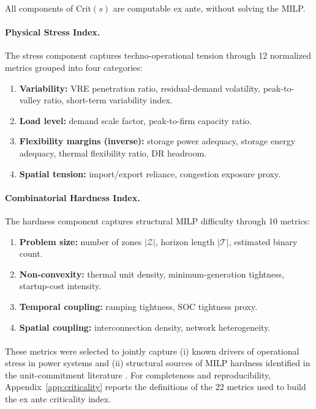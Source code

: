 \documentclass{article}
\let\parencite\citep
\begin{document}
All components of $\mathrm{Crit}(s)$ are computable ex ante, without solving the MILP.

\paragraph{Physical Stress Index.}
The stress component captures techno-operational tension through 12 normalized metrics grouped into four categories:
\begin{enumerate}[noitemsep, label=(\alph*)]
  \item \textbf{Variability:} VRE penetration ratio, residual-demand volatility, peak-to-valley ratio, short-term variability index.
  \item \textbf{Load level:} demand scale factor, peak-to-firm capacity ratio.
  \item \textbf{Flexibility margins (inverse):} storage power adequacy, storage energy adequacy, thermal flexibility ratio, DR headroom.
  \item \textbf{Spatial tension:} import/export reliance, congestion exposure proxy.
\end{enumerate}

\paragraph{Combinatorial Hardness Index.}
The hardness component captures structural MILP difficulty through 10 metrics:
\begin{enumerate}[noitemsep, label=(\alph*)]
  \item \textbf{Problem size:} number of zones $|\mathcal{Z}|$, horizon length $|\mathcal{T}|$, estimated binary count.
  \item \textbf{Non-convexity:} thermal unit density, minimum-generation tightness, startup-cost intensity.
  \item \textbf{Temporal coupling:} ramping tightness, SOC tightness proxy.
  \item \textbf{Spatial coupling:} interconnection density, network heterogeneity.
\end{enumerate}

\paragraph{}
These metrics were selected to jointly capture (i) known drivers of operational stress in power systems and (ii) structural sources of MILP hardness identified in the unit-commitment literature \parencite{buchheim_polytope_2023, huang_cutting_2021, morales_espana_tight_2013}. For completeness and reproducibility, Appendix~\ref{app:criticality} reports the definitions of the 22 metrics used to build the ex ante criticality index.
\end{document}
